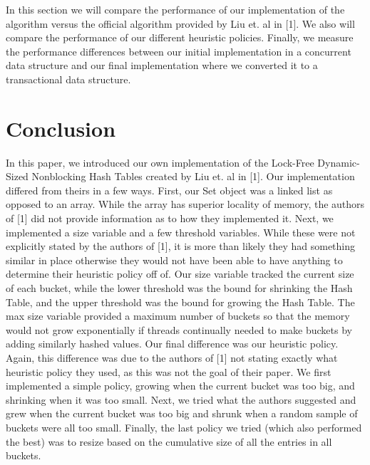 \documentclass[11pt]{article} %
\begin{document}
In this section we will compare the performance of our implementation of the algorithm versus the official algorithm provided by Liu et. al in [1]. We also will compare the performance of our different heuristic policies. Finally, we measure the performance differences between our initial implementation in a concurrent data structure and our final implementation where we converted it to a transactional data structure.

\section{Conclusion}

In this paper, we introduced our own implementation of the Lock-Free Dynamic-Sized Nonblocking Hash Tables created by Liu et. al in [1]. Our implementation differed from theirs in a few ways. First, our Set object was a linked list as opposed to an array. While the array has superior locality of memory, the authors of [1] did not provide information as to how they implemented it. Next, we implemented a size variable and a few threshold variables. While these were not explicitly stated by the authors of [1], it is more than likely they had something similar in place otherwise they would not have been able to have anything to determine their heuristic policy off of. Our size variable tracked the current size of each bucket, while the lower threshold was the bound for shrinking the Hash Table, and the upper threshold was the bound for growing the Hash Table. The max size variable provided a maximum number of buckets so that the memory would not grow exponentially if threads continually needed to make buckets by adding similarly hashed values. Our final difference was our heuristic policy. Again, this difference was due to the authors of [1] not stating exactly what heuristic policy they used, as this was not the goal of their paper. We first implemented a simple policy, growing when the current bucket was too big, and shrinking when it was too small. Next, we tried what the authors suggested and grew when the current bucket was too big and shrunk when a random sample of buckets were all too small. Finally, the last policy we tried (which also performed the best) was to resize based on the cumulative size of all the entries in all buckets. 
\end{document}
